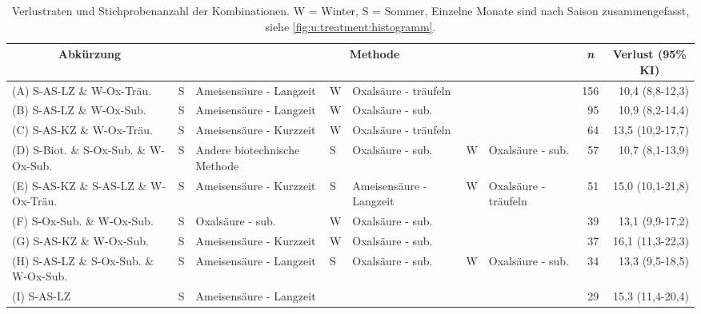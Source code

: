 \newpage
\begin{landscape}

\begin{table}[H]
    \centering
    \caption{Verlustraten und Stichprobenanzahl der Kombinationen. W = Winter, S = Sommer, Einzelne Monate sind nach Saison zusammengefasst, siehe \cref{fig:u:treatment:histogramm}.}
    \scriptsize
    \setlength{\tabcolsep}{0.5em} %
    \label{tab:u:kombinationen}
    \begin{tabular}{|l|*{6}{l}|*{2}{r|}}
        \hline
            \multicolumn{1}{|c|}{Abkürzung} & 
            \multicolumn{6}{c|}{Methode} & 
            \multicolumn{1}{c|}{\textit{n}} &
            \multicolumn{1}{c|}{Verlust (95\% KI)}
            \\
        \hline
        (A) S-AS-LZ   \& W-Ox-Träu.             & S & Ameisensäure - Langzeit       & W & Oxalsäure - träufeln      &   &                       & 156 & 10,4 (8,8-12,3) \\
        (B) S-AS-LZ   \& W-Ox-Sub.              & S & Ameisensäure - Langzeit       & W & Oxalsäure - sub.          &   &                       &  95 & 10,9 (8,2-14,4) \\
        (C) S-AS-KZ   \& W-Ox-Träu.             & S & Ameisensäure - Kurzzeit       & W & Oxalsäure - träufeln      &   &                       &  64 & 13,5 (10,2-17,7) \\
        (D) S-Biot.   \& S-Ox-Sub. \& W-Ox-Sub. & S & Andere biotechnische Methode  & S & Oxalsäure - sub.          & W & Oxalsäure - sub.      &  57 & 10,7 (8,1-13,9) \\
        (E) S-AS-KZ   \& S-AS-LZ \& W-Ox-Träu.  & S & Ameisensäure - Kurzzeit       & S & Ameisensäure - Langzeit   & W & Oxalsäure - träufeln  &  51 & 15,0 (10,1-21,8) \\
        (F) S-Ox-Sub. \& W-Ox-Sub.              & S & Oxalsäure - sub.              & W & Oxalsäure - sub.          &   &                       &  39 & 13,1 (9,9-17,2) \\
        (G) S-AS-KZ   \& W-Ox-Sub.              & S & Ameisensäure - Kurzzeit       & W & Oxalsäure - sub.          &   &                       &  37 & 16,1 (11,3-22,3) \\
        (H) S-AS-LZ   \& S-Ox-Sub. \& W-Ox-Sub. & S & Ameisensäure - Langzeit       & S & Oxalsäure - sub.          & W & Oxalsäure - sub.      &  34 & 13,3 (9,5-18,5) \\
        (I) S-AS-LZ                             & S & Ameisensäure - Langzeit       &   &                           &   &                       &  29 & 15,3 (11,4-20,4) \\

\end{tabular}
\end{table}
\end{landscape}
